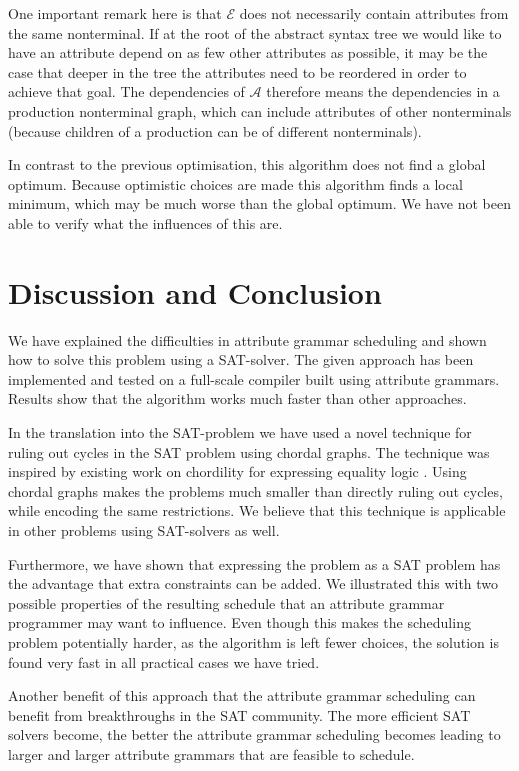 \documentclass{llncs}
\begin{document}
One important remark here is that $\mathcal{E}$ does not necessarily contain attributes from the same nonterminal. If at the root of the abstract syntax tree we would like to have an attribute depend on as few other attributes as possible, it may be the case that deeper in the tree the attributes need to be reordered in order to achieve that goal. The dependencies of $\mathcal{A}$ therefore means the dependencies in a production nonterminal graph, which can include attributes of other nonterminals (because children of a production can be of different nonterminals).

In contrast to the previous optimisation, this algorithm does not find a global optimum. Because optimistic choices are made this algorithm finds a local minimum, which may be much worse than the global optimum. We have not been able to verify what the influences of this are.

\section{Discussion and Conclusion} \label{sect:conclusion}
We have explained the difficulties in attribute grammar scheduling and shown how to solve this problem using a SAT-solver. The given approach has been implemented and tested on a full-scale compiler built using attribute grammars. Results show that the algorithm works much faster than other approaches.

In the translation into the SAT-problem we have used a novel technique for ruling out cycles in the SAT problem using chordal graphs. The technique was inspired by existing work on chordility for expressing equality logic \cite{bryant-chordal}. Using chordal graphs makes the problems much smaller than directly ruling out cycles, while encoding the same restrictions. We believe that this technique is applicable in other problems using SAT-solvers as well.

Furthermore, we have shown that expressing the problem as a SAT problem has the advantage that extra constraints can be added. We illustrated this with two possible properties of the resulting schedule that an attribute grammar programmer may want to influence. Even though this makes the scheduling problem potentially harder, as the algorithm is left fewer choices, the solution is found very fast in all practical cases we have tried.

Another benefit of this approach that the attribute grammar scheduling can benefit from breakthroughs in the SAT community. The more efficient SAT solvers become, the better the attribute grammar scheduling becomes leading to larger and larger attribute grammars that are feasible to schedule.
\end{document}
